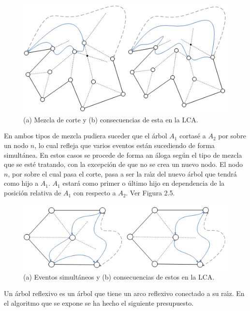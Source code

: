 \documentclass[12pt,english]{report}
\begin{document}
\begin{figure}[htbp]
\begin{center}
\includegraphics[width=15cm]{corte1.jpg}
\end{center}
\caption{(a) Mezcla de corte y (b) consecuencias de esta en la LCA.}
\end{figure}

En ambos tipos de mezcla pudiera suceder que el \'{a}rbol $A_{1}$ cortas\'{e}
a $A_{2}$ por sobre un nodo $n$, lo cual refleja que varios eventos est\'{a}n
sucediendo de forma simult\'{a}nea. En estos casos se procede de forma an%
\'{a}loga seg\'{u}n el tipo de mezcla que se est\'{e} tratando, con la
excepci\'{o}n de que no se crea un nuevo nodo. El nodo $n$, por sobre el cual pasa
el corte, pasa a ser la ra\'{\i}z del nuevo \'{a}rbol que tendr\'a como hijo a $A_{1}$. $A_{1}$ estar\'a como primer o \'ultimo hijo en dependencia de la posici\'on relativa de $A_{1}$ con respecto a $A_{2}$. Ver Figura 2.5.

\begin{figure}[htbp]
\begin{center}
\includegraphics{nodo1.jpg}
\end{center}
\caption{(a) Eventos simult\'aneos y (b) consecuencias de estos en la LCA.}
\end{figure}

Un \'{a}rbol reflexivo es un \'{a}rbol que tiene un arco reflexivo conectado
a su ra\'{\i}z. En el algoritmo que se expone se ha hecho el siguiente
presupuesto.
\end{document}
